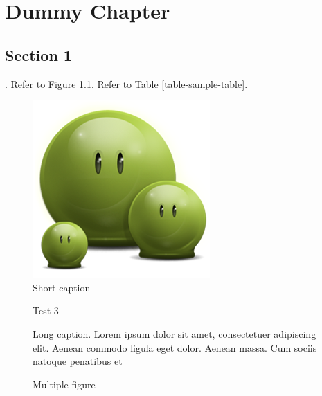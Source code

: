\chapter{Dummy Chapter}

\section{Section 1} \label{chap-dummy-section-1}

\lipsum[1]. Refer to Figure \ref{fig-sample-image}. Refer to Table \ref{table-sample-table}.

\begin{figure}[ht!]\centering
\includegraphics{asset/green}
\caption{Short caption}
\label{fig-sample-image}
\end{figure}

\begin{figure}[ht!]\centering
Test 3
\caption{Long caption. Lorem ipsum dolor sit amet, consectetuer adipiscing elit. Aenean commodo ligula eget dolor. Aenean massa. Cum sociis natoque penatibus et}
\end{figure}

\begin{figure}[!ht]\centering
	\centering
	\caption{Multiple figure} 
	\label{fig-sample-image-2}
\end{figure} 

